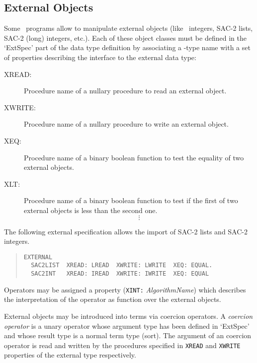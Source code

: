 \subsection{External Objects}
\label{ExternalObjects}
Some \redux\  programs allow to manipulate external objects (like
\ALDES\ integers, SAC-2 lists, SAC-2 (long) integers, etc.).
Each of these object classes must be defined in the `ExtSpec' part
of the data type definition by associating a \redux-type name with a set
of properties describing the interface to the external data type:

\begin{description}
\item[XREAD:] Procedure name of a nullary procedure to read an external object.

\item[XWRITE:] Procedure name of a nullary procedure to write
an external object.

\item[XEQ:] Procedure name of a binary boolean function to test the
equality of two external objects.

\item[XLT:] Procedure name of a binary boolean function to test if the
first of two external objects is less than the second one.
\[\vdots\]

\end{description}

\begin{example}
The following external specification allows the import of SAC-2 lists and
SAC-2 integers.
\begin{quote}
\begin{verbatim}
EXTERNAL
  SAC2LIST  XREAD: LREAD  XWRITE: LWRITE  XEQ: EQUAL.
  SAC2INT   XREAD: IREAD  XWRITE: IWRITE  XEQ: EQUAL
\end{verbatim}
\end{quote}
\end{example}

Operators may be assigned a property ({\tt XINT:} {\em AlgorithmName})
which describes the interpretation of the operator as function over the
external objects.

External objects may be introduced into terms via coercion operators.
A {\em coercion operator} is a unary operator whose argument type has been
defined in `ExtSpec' and whose result type is a normal term type (sort).
The argument of an coercion operator is read and written by the
procedures specified in {\tt XREAD} and {\tt XWRITE} properties
of the external type respectively.

